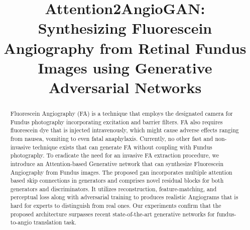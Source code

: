 \documentclass[a4paper,conference]{IEEEtran}
\begin{document}
\title{Attention2AngioGAN: Synthesizing Fluorescein Angiography from Retinal Fundus Images using Generative Adversarial Networks}


\author{
}














\maketitle

\begin{abstract}
Fluorescein Angiography (FA) is a technique that employs the designated camera for Fundus photography incorporating excitation and barrier filters. FA also requires fluorescein dye that is injected intravenously, which might cause adverse effects ranging from nausea, vomiting to even fatal anaphylaxis. Currently, no other fast and non-invasive technique exists that can generate FA without coupling with Fundus photography. To eradicate the need for an invasive FA extraction procedure, we introduce an Attention-based Generative network that can synthesize Fluorescein Angiography from Fundus images. The proposed gan incorporates multiple attention based skip connections in generators and comprises novel residual blocks for both generators and discriminators. It utilizes reconstruction, feature-matching, and perceptual loss along with adversarial training to produces realistic Angiograms that is hard for experts to distinguish from real ones. Our experiments confirm that the proposed architecture surpasses recent state-of-the-art generative networks for fundus-to-angio translation task. 
\end{abstract}
\end{document}
